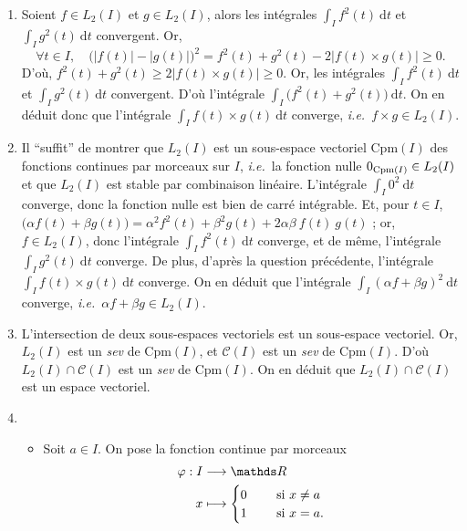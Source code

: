 \begin{exo}
	\begin{enumerate}
		\item Soient $f \in L_2(I)$\/ et $g \in L_2(I)$, alors les intégrales $\int_{I} f^2(t)~\mathrm{d}t$\/ et $\int_{I} g^2(t)~\mathrm{d}t$\/ convergent. Or,
			\[
				\forall t \in I,\quad \Big(\big|f(t)\big| - \big|g(t)\big|\Big)^2  = f^2(t) + g^2(t) - 2 \big|f(t)\times g(t)\big| \ge 0
			.\] D'où, $f^2(t) + g^2(t) \ge 2 \big|f(t)\times g(t)\big|\ge 0$. Or, les intégrales $\int_{I} f^2(t)~\mathrm{d}t$\/ et $\int_{I} g^2(t)~\mathrm{d}t$\/ convergent. D'où l'intégrale $\int_{I} \big(f^2(t) + g^2(t)\big)~\mathrm{d}t$. On en déduit donc que l'intégrale $\int_{I} f(t) \times g(t)~\mathrm{d}t$\/ converge, \textit{i.e.}\ $f \times g \in L_2(I)$.
		\item Il ``suffit'' de montrer que $L_2(I)$\/ est un sous-espace vectoriel $\mathrm{Cpm}(I)$\/ des fonctions continues par morceaux sur $I$, \textit{i.e.}\ la fonction nulle $\smash{0_{\mathrm{Cpm}(I)}} \in L_2(I)$\/ et que $L_2(I)$\/ est stable par combinaison linéaire.
			L'intégrale $\int_{I} 0^2 ~\mathrm{d}t$\/ converge, donc la fonction nulle est bien de carré intégrable. Et, pour $t \in I$, $\big(\alpha f(t) + \beta g(t)\big) = \alpha^2 f^2(t) + \beta^2 g(t) + 2 \alpha \beta\:f(t)\:g(t)$ ; or, $f \in L_2(I)$, donc l'intégrale $\int_{I} f^2(t)~\mathrm{d}t$\/ converge, et de même, l'intégrale~$\int_{I} g^2(t)~\mathrm{d}t$\/ converge. De plus, d'après la question précédente, l'intégrale $\int_{I} f(t) \times g(t)~\mathrm{d}t$\/ converge. On en déduit que l'intégrale $\int_{I}(\alpha f + \beta g)^2 ~\mathrm{d}t$ converge, \textit{i.e.}\ $\alpha f + \beta g \in L_2(I)$.
		\item L'intersection de deux sous-espaces vectoriels est un sous-espace vectoriel. Or, $L_2(I)$\/ est un \textit{sev} de $\mathrm{Cpm}(I)$, et $\mathcal{C}(I)$\/ est un \textit{sev} de $\mathrm{Cpm}(I)$. D'où $L_2(I) \cap \mathcal{C}(I)$\/ est un \textit{sev} de $\mathrm{Cpm}(I)$. On en déduit que $L_2(I) \cap \mathcal{C}(I)$\/ est un espace vectoriel.
		\item
			\begin{itemize}
				\item Soit $a \in I$. On pose la fonction continue par morceaux \begin{align*}
						\varphi: I &\longrightarrow \R \\
						x &\longmapsto \begin{cases}
							0 &\quad \text{ si } x \neq a\\
							1 &\quad \text{ si } x = a.

\end{cases}
\end{align*}
\end{itemize}
\end{enumerate}
\end{exo}
